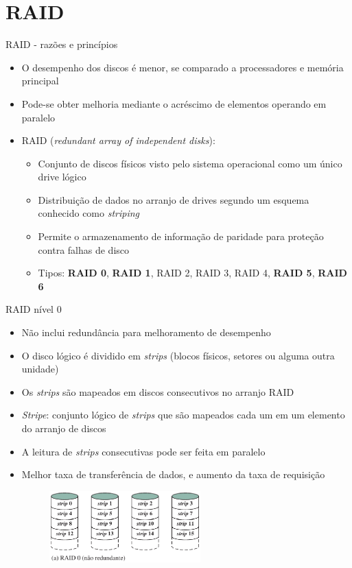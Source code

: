 \section[slide=true]{RAID}
\begin{slide}{RAID - razões e princípios}
	\begin{itemize}
		\item O desempenho dos discos é menor, se comparado a processadores e memória principal
		\item Pode-se obter melhoria mediante o acréscimo de elementos operando em paralelo
		\item RAID (\emph{redundant array of independent disks}):
			\begin{itemize}
				\item Conjunto de discos físicos visto pelo sistema operacional como um único drive lógico
				\item Distribuição de dados no arranjo de drives segundo um esquema conhecido como \emph{striping}
				\item Permite o armazenamento de informação de paridade para proteção contra falhas de disco
				\item Tipos: \textbf{RAID 0}, \textbf{RAID 1}, RAID 2, RAID 3, RAID 4, \textbf{RAID 5}, \textbf{RAID 6}
			\end{itemize}
	\end{itemize}
\end{slide}

\begin{slide}{RAID nível 0}
	\begin{itemize}
		\item Não inclui redundância para melhoramento de desempenho
		\item O disco lógico é dividido em \emph{strips} (blocos físicos, setores ou alguma outra unidade)
		\item Os \emph{strips} são mapeados em discos consecutivos no arranjo RAID
		\item \emph{Stripe}: conjunto lógico de \emph{strips} que são mapeados cada um em um elemento do arranjo de discos
		\item A leitura de \emph{strips} consecutivas pode ser feita em paralelo
		\item Melhor taxa de transferência de dados, e aumento da taxa de requisição
			\begin{figure}[h]
				\centering
				\includegraphics[width=0.55\textwidth]{figs/raid0}
			\end{figure}
	\end{itemize}
\end{slide}

